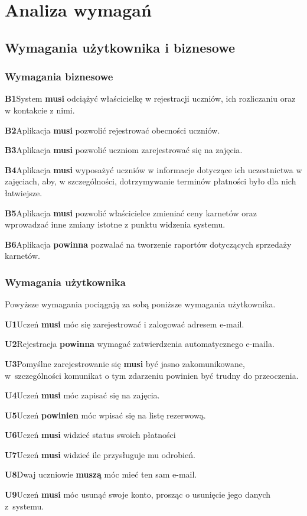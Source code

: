 \documentclass{article}
\begin{document}
\section{Analiza wymagań}

\subsection{Wymagania użytkownika i biznesowe}
\newcommand{\wymaganie}[2]{
    \textbf{\textsc{#1}}\hspace{1em}#2\\\vspace{0.5em}
}
\subsubsection*{Wymagania biznesowe}
\wymaganie{B1}{System \textbf{musi} odciążyć właścicielkę w rejestracji uczniów, ich rozliczaniu oraz w kontakcie z nimi.}
\wymaganie{B2}{Aplikacja \textbf{musi} pozwolić rejestrować obecności uczniów.}
\wymaganie{B3}{Aplikacja \textbf{musi} pozwolić uczniom zarejestrować się na zajęcia.}
\wymaganie{B4}{Aplikacja \textbf{musi} wyposażyć uczniów w informacje dotyczące ich uczestnictwa w zajęciach,
    aby, w szczególności, dotrzymywanie terminów płatności było dla nich łatwiejsze.}
\wymaganie{B5}{Aplikacja \textbf{musi} pozwolić właścicielce zmieniać ceny karnetów
    oraz wprowadzać inne zmiany istotne z punktu widzenia systemu.}
\wymaganie{B6}{Aplikacja \textbf{powinna} pozwalać na tworzenie raportów dotyczących sprzedaży karnetów.}

\vspace{-0.5em}
\subsubsection*{Wymagania użytkownika}
Powyższe wymagania pociągają za sobą poniższe wymagania użytkownika.

\vspace{1em}
\wymaganie{U1}{Uczeń \textbf{musi} móc się zarejestrować i zalogować adresem e-mail.}
\wymaganie{U2}{Rejestracja \textbf{powinna} wymagać zatwierdzenia automatycznego e-maila.}
\wymaganie{U3}{Pomyślne zarejestrowanie się \textbf{musi} być jasno zakomunikowane,
    w~szczególności komunikat o tym zdarzeniu powinien być trudny do przeoczenia.}
\wymaganie{U4}{Uczeń \textbf{musi} móc zapisać się na zajęcia.}
\wymaganie{U5}{Uczeń \textbf{powinien} móc wpisać się na listę rezerwową.}
\wymaganie{U6}{Uczeń \textbf{musi} widzieć status swoich płatności}
\wymaganie{U7}{Uczeń \textbf{musi} widzieć ile przysługuje mu odrobień.}
\wymaganie{U8}{Dwaj uczniowie \textbf{muszą} móc mieć ten sam e-mail.}
\wymaganie{U9}{Uczeń \textbf{musi} móc usunąć swoje konto, prosząc o usunięcie jego danych z~systemu.}
\end{document}
